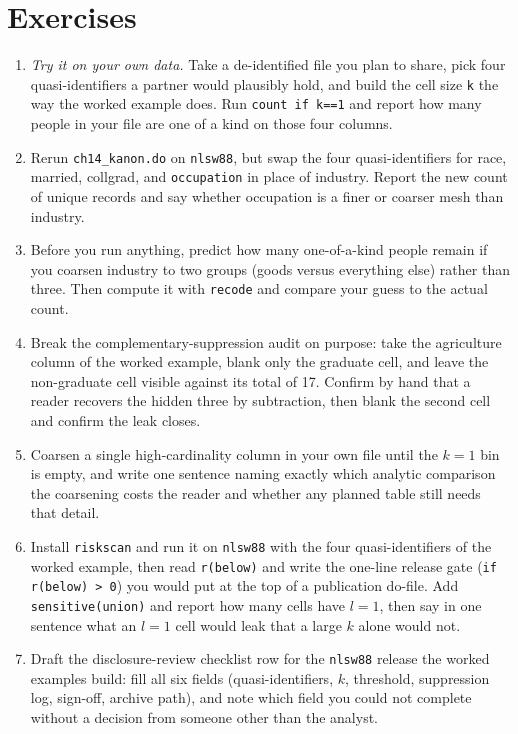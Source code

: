 \section*{Exercises}
\begin{enumerate}
\item \emph{Try it on your own data.} Take a de-identified file you plan to share, pick four quasi-identifiers a partner would plausibly hold, and build the cell size \texttt{k} the way the worked example does. Run \texttt{count if k==1} and report how many people in your file are one of a kind on those four columns.
\item Rerun \texttt{ch14\_kanon.do} on \texttt{nlsw88}, but swap the four quasi-identifiers for race, married, collgrad, and \texttt{occupation} in place of industry. Report the new count of unique records and say whether occupation is a finer or coarser mesh than industry.
\item Before you run anything, predict how many one-of-a-kind people remain if you coarsen industry to two groups (goods versus everything else) rather than three. Then compute it with \texttt{recode} and compare your guess to the actual count.
\item Break the complementary-suppression audit on purpose: take the agriculture column of the worked example, blank only the graduate cell, and leave the non-graduate cell visible against its total of 17. Confirm by hand that a reader recovers the hidden three by subtraction, then blank the second cell and confirm the leak closes.
\item Coarsen a single high-cardinality column in your own file until the $k=1$ bin is empty, and write one sentence naming exactly which analytic comparison the coarsening costs the reader and whether any planned table still needs that detail.
\item Install \texttt{riskscan} and run it on \texttt{nlsw88} with the four quasi-identifiers of the worked example, then read \texttt{r(below)} and write the one-line release gate (\texttt{if r(below) > 0}) you would put at the top of a publication do-file. Add \texttt{sensitive(union)} and report how many cells have $l=1$, then say in one sentence what an $l=1$ cell would leak that a large $k$ alone would not.
\item Draft the disclosure-review checklist row for the \texttt{nlsw88} release the worked examples build: fill all six fields (quasi-identifiers, $k$, threshold, suppression log, sign-off, archive path), and note which field you could not complete without a decision from someone other than the analyst.
\end{enumerate}
